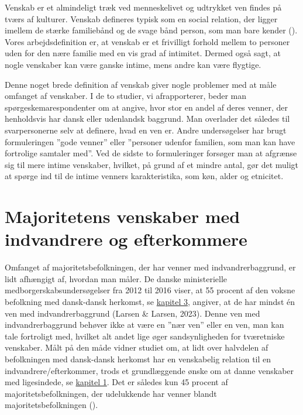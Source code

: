 \documentclass[
]{book}
\begin{document}
Venskab er et almindeligt træk ved menneskelivet og udtrykket ven findes på tværs af kulturer. Venskab defineres typisk som en social relation, der ligger imellem de stærke familiebånd og de svage bånd person, som man bare kender (). Vores arbejdsdefinition er, at venskab er et frivilligt forhold mellem to personer uden for den nære familie med en vis grad af intimitet. Dermed også sagt, at nogle venskaber kan være ganske intime, mens andre kan være flygtige.

Denne noget brede definition af venskab giver nogle problemer med at måle omfanget af venskaber. I de to studier, vi afrapporterer, beder man spørgeskemarespondenter om at angive, hvor stor en andel af deres venner, der henholdsvis har dansk eller udenlandsk baggrund. Man overlader det således til svarpersonerne selv at definere, hvad en ven er. Andre undersøgelser har brugt formuleringen ''gode venner'' eller ''personer udenfor familien, som man kan have fortrolige samtaler med''. Ved de sidste to formuleringer forsøger man at afgrænse sig til mere intime venskaber, hvilket, på grund af et mindre antal, gør det muligt at spørge ind til de intime venners karakteristika, som køn, alder og etnicitet.

\section{Majoritetens venskaber med indvandrere og efterkommere}\label{majoritetens-venskaber-med-indvandrere-og-efterkommere}

Omfanget af majoritetsbefolkningen, der har venner med indvandrerbaggrund, er lidt afhængigt af, hvordan man måler. De danske ministerielle medborgerskabsundersøgelser fra 2012 til 2016 viser, at 55 procent af den voksne befolkning med dansk-dansk herkomst, se \hyperref[kap3]{kapitel 3}, angiver, at de har mindst én ven med indvandrerbaggrund (Larsen \& Larsen, 2023). Denne ven med indvandrerbaggrund behøver ikke at være en ''nær ven'' eller en ven, man kan tale fortroligt med, hvilket alt andet lige øger sandsynligheden for tværetniske venskaber. Målt på den måde vidner studiet om, at lidt over halvdelen af befolkningen med dansk-dansk herkomst har en venskabelig relation til en indvandrere/efterkommer, trods et grundlæggende ønske om at danne venskaber med ligesindede, se \hyperref[kap1]{kapitel 1}. Det er således kun 45 procent af majoritetsbefolkningen, der udelukkende har venner blandt majoritetsbefolkningen ().
\end{document}
